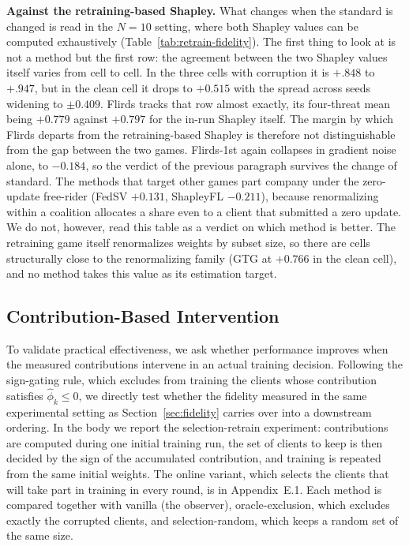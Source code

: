 \documentclass[letterpaper]{article} %
\theoremstyle{definition} %
\begin{document}
\textbf{Against the retraining-based Shapley.} What changes when the standard
is changed is read in the $N{=}10$ setting, where both Shapley values can be
computed exhaustively (Table~\ref{tab:retrain-fidelity}). The first thing to
look at is not a method but the first row: the agreement between the two
Shapley values itself varies from cell to cell. In the three cells with
corruption it is $+.848$ to $+.947$, but in the clean cell it drops to
$+0.515$ with the spread across seeds widening to $\pm0.409$. Flirds tracks
that row almost exactly, its four-threat mean being $+0.779$ against
$+0.797$ for the in-run Shapley itself. The margin by which Flirds departs
from the retraining-based Shapley is therefore not distinguishable from the
gap between the two games. Flirds-1st again collapses in gradient noise alone,
to $-0.184$, so the verdict of the previous paragraph survives the change of
standard. The methods that target other games part company under the
zero-update free-rider (FedSV $+0.131$, ShapleyFL $-0.211$), because
renormalizing within a coalition allocates a share even to a client that
submitted a zero update. We do not, however, read this table as a verdict on
which method is better. The retraining game itself renormalizes weights by
subset size, so there are cells structurally close to the renormalizing
family (GTG at $+0.766$ in the clean cell), and no method takes this value as
its estimation target.

\subsection{Contribution-Based Intervention}
\label{sec:intervention}

To validate practical effectiveness, we ask whether performance improves when
the measured contributions intervene in an actual training decision.
Following the sign-gating rule, which excludes from training the clients
whose contribution satisfies $\hat\phi_k \le 0$, we directly test whether the
fidelity measured in the same experimental setting as
Section~\ref{sec:fidelity} carries over into a downstream ordering. In the
body we report the selection-retrain experiment: contributions are computed
during one initial training run, the set of clients to keep is then decided
by the sign of the accumulated contribution, and training is repeated from
the same initial weights. The online variant, which selects the clients that
will take part in training in every round, is in Appendix~E.1. Each method is
compared together with vanilla (the observer), oracle-exclusion, which
excludes exactly the corrupted clients, and selection-random, which keeps a
random set of the same size.
\end{document}
